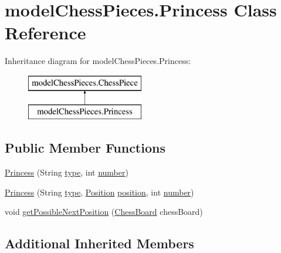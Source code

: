 \hypertarget{classmodel_chess_pieces_1_1_princess}{\section{model\+Chess\+Pieces.\+Princess Class Reference}
\label{classmodel_chess_pieces_1_1_princess}
}
Inheritance diagram for model\+Chess\+Pieces.\+Princess\+:\begin{figure}[H]
\begin{center}
\leavevmode
\includegraphics[height=2.000000cm]{classmodel_chess_pieces_1_1_princess}
\end{center}
\end{figure}
\subsection*{Public Member Functions}
\begin{DoxyCompactItemize}
\item 
\hyperlink{classmodel_chess_pieces_1_1_princess_a33cb1197bcb1f8808ea931626f2cf90b}{Princess} (String \hyperlink{classmodel_chess_pieces_1_1_chess_piece_a195487ca88c197af7c1604247be31db2}{type}, int \hyperlink{classmodel_chess_pieces_1_1_chess_piece_a979e63b99128333883acedc38d25dc87}{number})
\item 
\hyperlink{classmodel_chess_pieces_1_1_princess_a4c6de589407a7e236d78a89cffd41b97}{Princess} (String \hyperlink{classmodel_chess_pieces_1_1_chess_piece_a195487ca88c197af7c1604247be31db2}{type}, \hyperlink{classmodel_core_1_1_position}{Position} \hyperlink{classmodel_chess_pieces_1_1_chess_piece_a3d4362d5b28f6edb14161196d9c6807d}{position}, int \hyperlink{classmodel_chess_pieces_1_1_chess_piece_a979e63b99128333883acedc38d25dc87}{number})
\item 
void \hyperlink{classmodel_chess_pieces_1_1_princess_aa7c8b759767abcfc81e9e5ba74ac0bc0}{get\+Possible\+Next\+Position} (\hyperlink{classmodel_core_1_1_chess_board}{Chess\+Board} chess\+Board)
\end{DoxyCompactItemize}
\subsection*{Additional Inherited Members}


